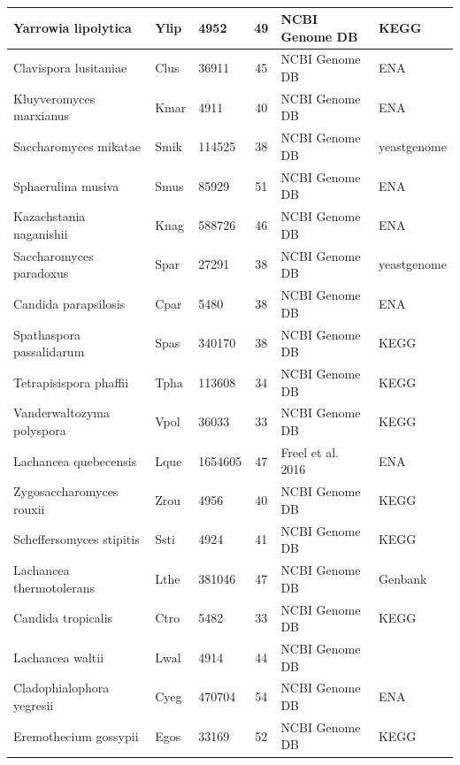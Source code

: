 \documentclass[12pt,draft]{article}
\begin{document}
\begin{table}
\begin{tabular}{ | l | l | l | c | l | l | }
	Yarrowia lipolytica 		& Ylip 		& 4952 			& 49 	& NCBI Genome DB 	& KEGG \\ \hline
	Clavispora lusitaniae 		& Clus 		& 36911 		& 45 	& NCBI Genome DB 	& ENA \\ \hline
	Kluyveromyces marxianus 	& Kmar 		& 4911 			& 40 	& NCBI Genome DB 	& ENA \\ \hline
	Saccharomyces mikatae 		& Smik 		& 114525 		& 38 	& NCBI Genome DB 	& yeastgenome \\ \hline
	Sphaerulina musiva 		& Smus 		& 85929 		& 51 	& NCBI Genome DB 	& ENA \\ \hline
	Kazachstania naganishii 	& Knag 		& 588726 		& 46 	& NCBI Genome DB 	& ENA \\ \hline
	Saccharomyces paradoxus 	& Spar 		& 27291 		& 38 	& NCBI Genome DB 	& yeastgenome \\ \hline
	Candida parapsilosis 		& Cpar 		& 5480 			& 38 	& NCBI Genome DB 	& ENA \\ \hline
	Spathaspora passalidarum 	& Spas 		& 340170 		& 38 	& NCBI Genome DB 	& KEGG \\ \hline
	Tetrapisispora phaffii 		& Tpha 		& 113608 		& 34 	& NCBI Genome DB 	& KEGG \\ \hline
	Vanderwaltozyma polyspora 	& Vpol 		& 36033 		& 33 	& NCBI Genome DB 	& KEGG \\ \hline
	Lachancea quebecensis 		& Lque 		& 1654605 		& 47 	& Freel et al. 2016 	& ENA \\ \hline
	Zygosaccharomyces rouxii 	& Zrou 		& 4956 			& 40 	& NCBI Genome DB 	& KEGG \\ \hline
	Scheffersomyces stipitis 	& Ssti 		& 4924 			& 41 	& NCBI Genome DB 	& KEGG \\ \hline
	Lachancea thermotolerans 	& Lthe 		& 381046 		& 47 	& NCBI Genome DB 	& Genbank \\ \hline
	Candida tropicalis 		& Ctro 		& 5482 			& 33 	& NCBI Genome DB 	& KEGG \\ \hline
	Lachancea waltii 		& Lwal 		& 4914 			& 44 	& NCBI Genome DB 	& \  \\ \hline
	Cladophialophora yegresii 	& Cyeg 		& 470704 		& 54 	& NCBI Genome DB 	& ENA \\ \hline
	Eremothecium gossypii 		& Egos 		& 33169 		& 52 	& NCBI Genome DB 	& KEGG \\ \hline
\end{tabular}
\caption{}
\label{tab:org_overview}
\end{table}
\end{document}
